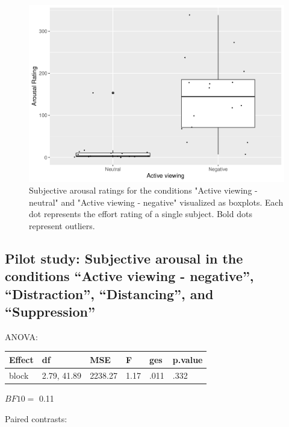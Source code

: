 \documentclass[
  english,
  man,floatsintext]{apa6}
\begin{document}
\begin{figure}[H]
\includegraphics[width=0.75\linewidth]{Manuscript_ERED_Stage1_files/figure-latex/FigSubjArousalViewPilot-1} \caption{Subjective arousal ratings for the conditions "Active viewing - neutral" and "Active viewing - negative" visualized as boxplots. Each dot represents the effort rating of a single subject. Bold dots represent outliers.}\label{fig:FigSubjArousalViewPilot}
\end{figure}

\hypertarget{pilot-study-subjective-arousal-in-the-conditions-active-viewing---negative-distraction-distancing-and-suppression}{%
\subsection{Pilot study: Subjective arousal in the conditions ``Active viewing - negative'', ``Distraction'', ``Distancing'', and ``Suppression''}\label{pilot-study-subjective-arousal-in-the-conditions-active-viewing---negative-distraction-distancing-and-suppression}}

ANOVA:

\begin{tabular}{l|l|l|l|l|l}
\hline
Effect & df & MSE & F & ges & p.value\\
\hline
block & 2.79, 41.89 & 2238.27 & 1.17 & .011 & .332\\
\hline
\end{tabular}

\(BF10=\) 0.11

Paired contrasts:
\end{document}
